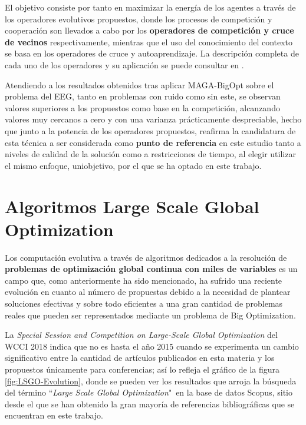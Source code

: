 El objetivo consiste por tanto en maximizar la energía de los agentes a través de los operadores evolutivos propuestos, donde los procesos de competición y cooperación son llevados a cabo por los \textbf{operadores de competición y cruce de vecinos} respectivamente, mientras que el uso del conocimiento del contexto se basa en los operadores de cruce y autoaprendizaje. La descripción completa de cada uno de los operadores y su aplicación se puede consultar en \cite{MAGA-BigOpt}.

Atendiendo a los resultados obtenidos tras aplicar MAGA-BigOpt sobre el problema del EEG, tanto en problemas con ruido como sin este, se observan valores superiores a los propuestos como base en la competición, alcanzando valores muy cercanos a cero y con una varianza prácticamente despreciable, hecho que junto a la potencia de los operadores propuestos, reafirma la candidatura de esta técnica a ser considerada como \textbf{punto de referencia} en este estudio tanto a niveles de calidad de la solución como a restricciones de tiempo, al elegir utilizar el mismo enfoque, uniobjetivo, por el que se ha optado en este trabajo.

\section{Algoritmos Large Scale Global Optimization} \label{cap:revisionLSGO}

Los computación evolutiva a través de algoritmos dedicados a la resolución de \textbf{problemas de optimización global continua con miles de variables} es un campo que, como anteriormente ha sido mencionado, ha sufrido una reciente evolución en cuanto al número de propuestas debido a la necesidad de plantear soluciones efectivas y sobre todo eficientes a una gran cantidad de problemas reales que pueden ser representados mediante un problema de Big Optimization.

La \textit{Special Session and Competition on Large-Scale Global Optimization} del WCCI 2018\cite{WCCI-SHADEILS} indica que no es hasta el año 2015 cuando se experimenta un cambio significativo entre la cantidad de artículos publicados en esta materia y los propuestos únicamente para conferencias; así lo refleja el gráfico de la figura \ref{fig:LSGO-Evolution}, donde se pueden ver los resultados que arroja la búsqueda del término ``\textit{Large Scale Global Optimization}"\ en la base de datos Scopus\cite{SCOPUS}, sitio desde el que se han obtenido la gran mayoría de referencias bibliográficas que se encuentran en este trabajo.

